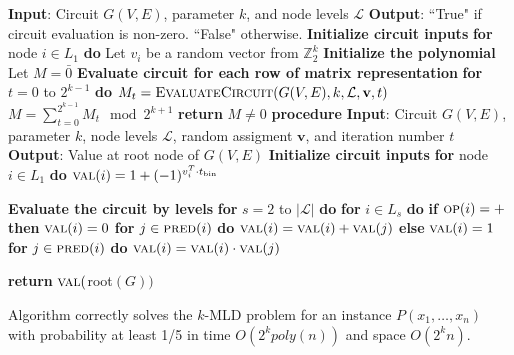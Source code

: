 \begin{algorithm}{}
\small
\caption{\maxwt{}$(G(V, E), k, \mathcal{L})$.}
\label{alg:multilinear-detect}
\begin{algorithmic}[1]
\STATE \textbf{Input}: Circuit $G(V, E)$, parameter $k$, and node levels $\mathcal{L}$
\STATE\textbf{Output}: ``True" if circuit evaluation is non-zero. ``False" otherwise.
\STATE \textbf{Initialize circuit inputs}
\STATE \textbf{for} node $i \in L_1$ \textbf{do}
\STATE \quad Let $v_i$ be a random vector from $\mathbb{Z}_{2}^k$
\STATE \textbf{Initialize the polynomial}
\STATE Let $M = \bar 0$
\STATE \textbf{Evaluate circuit for each row of matrix representation}
\STATE \textbf{for} $t = 0$ to $2^{k-1}$ \textbf{do}
\STATE \quad $M_t = \textsc{EvaluateCircuit}(G(V, E), k, \mathcal{L}, \mathbf{v}, t)$
\STATE $M = \sum_{t=0}^{2^{k-1}} M_t \mod 2^{k+1}$
\STATE \textbf{return} $M \neq 0$
\STATE
\STATE \textbf{procedure} 
\STATE \textbf{Input}: Circuit $G(V, E)$, parameter $k$, node levels $\mathcal{L}$, random assigment $\mathbf{v}$, and iteration number $t$
\STATE\textbf{Output}: Value at root node of $G(V,E)$
\STATE \textbf{Initialize circuit inputs}
\STATE \textbf{for} node $i \in L_1$ \textbf{do}
\STATE \quad $ \textsc{val}(i) = 1 + (-1)^{v_i^T \cdot t_{\text{bin}}}$

\STATE \textbf{Evaluate the circuit by levels}
\STATE \textbf{for} $s=2$ to $|\mathcal{L}|$ \textbf{do}
\STATE \quad \textbf{for} $i \in L_s$ \textbf{do}
\STATE \qquad \textbf{if} $\textsc{op}(i) = +$ \textbf{then}
\STATE \qquad \quad $\textsc{val}(i) = 0$
\STATE \qquad \quad \textbf{for} $j \in \textsc{pred}(i)$ \textbf{do}
\STATE \qquad \qquad $\textsc{val}(i) = \textsc{val}(i) + \textsc{val}(j)$
\STATE \qquad \textbf{else} 
\STATE \qquad \quad $\textsc{val}(i) = 1$
\STATE \qquad \quad \textbf{for} $j \in \textsc{pred}(i)$ \textbf{do}
\STATE \qquad \qquad $\textsc{val}(i) = \textsc{val}(i) \cdot \textsc{val}(j)$

\STATE \textbf{return} $\textsc{val}($root$(G))$
\end{algorithmic}
\end{algorithm}

\begin{theorem}
\label{theorem:kmld2}
Algorithm \maxwt{} correctly solves the \textsc{$k$-MLD} problem for an 
instance $P(x_1,\ldots,x_n)$ with probability at least 1/5 in time
$O(2^k poly(n))$ and space $O(2^k n)$.
\end{theorem}


